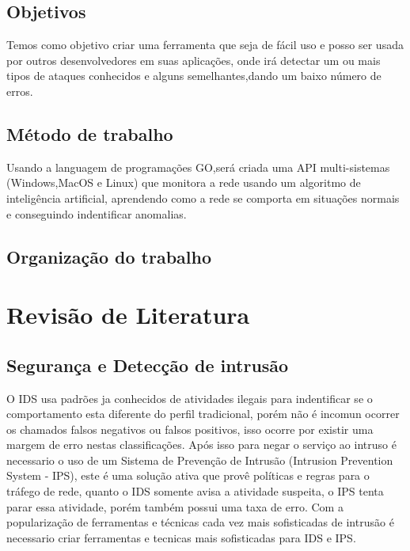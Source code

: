 \documentclass[
	12pt,				%
	openright,			%
	oneside,
	a4paper,			%
	english,			%
	french,				%
	spanish,			%
	brazil				%
	]{abntex2}
\begin{document}
\section{Objetivos}
Temos como objetivo criar uma ferramenta que seja de fácil uso e posso ser usada por outros desenvolvedores em suas aplicações, onde irá detectar um ou mais tipos de ataques conhecidos e alguns semelhantes,dando um baixo número de erros.

\section{Método de trabalho}
Usando a languagem de programações GO,será criada uma API multi-sistemas (Windows,MacOS e Linux) que monitora a rede usando um algoritmo de inteligência artificial, aprendendo como a rede se comporta em situações normais e conseguindo indentificar anomalias.
\section{Organização do trabalho}

\chapter[Revisão de Literatura]{Revisão de Literatura}
\section{Segurança e Detecção de intrusão}

O IDS usa padrões ja conhecidos de atividades ilegais para indentificar se o comportamento esta diferente do perfil tradicional, porém não é incomun ocorrer os chamados falsos negativos ou falsos positivos, isso ocorre por existir uma margem de erro nestas classificações. 
Após isso para negar o serviço ao intruso é necessario o uso de um Sistema de Prevenção de Intrusão (Intrusion Prevention System - IPS), este é uma solução ativa que provê políticas e regras para o tráfego de rede, quanto o IDS somente avisa a atividade suspeita, o IPS tenta parar essa atividade, porém também possui uma taxa de erro.
Com a popularização de ferramentas e técnicas cada vez mais sofisticadas de intrusão é necessario criar ferramentas e tecnicas mais sofisticadas para IDS e IPS.
\end{document}
